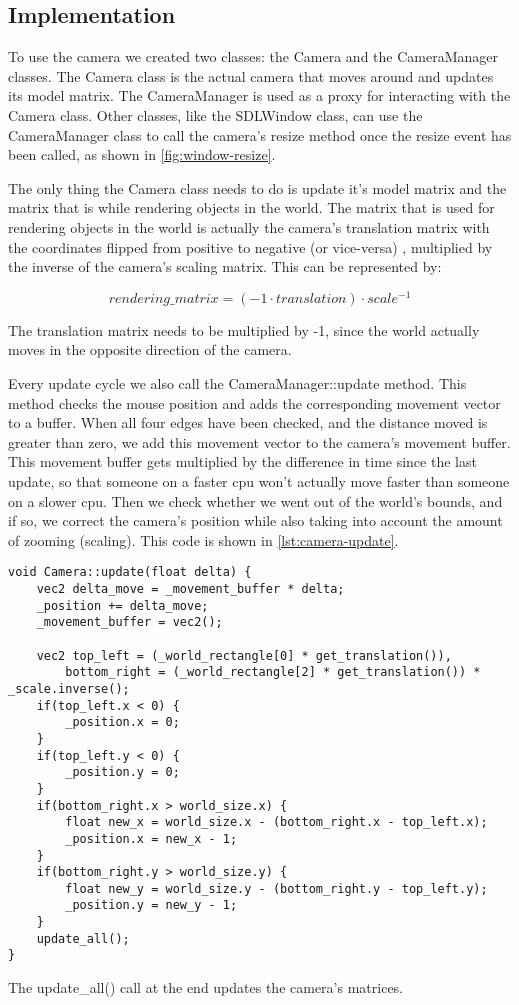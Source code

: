 \subsection{Implementation}
To use the camera we created two classes: the Camera and the CameraManager 
classes. The Camera class is the actual camera that moves around and updates 
its model matrix. The CameraManager is used as a proxy for interacting with 
the Camera class. Other classes, like the SDLWindow class, can use the 
CameraManager class to call the camera's resize method once the resize event 
has been called, as shown in \cref{fig:window-resize}.

The only thing the Camera class needs to do is update it's model matrix and 
the matrix that is while rendering objects in the world. The matrix that is 
used for rendering objects in the world is actually the camera's translation 
matrix with the coordinates flipped from positive to negative (or vice-versa)
, multiplied by the inverse of the camera's scaling matrix.
This can be represented by:

$$ rendering\_matrix = (-1 \cdot translation) \cdot scale^{-1} $$

The translation matrix needs to be multiplied by -1, since the world actually 
moves in the opposite direction of the camera.

Every update cycle we also call the CameraManager::update method. This method 
checks the mouse position and adds the corresponding movement vector to a 
buffer. When all four edges have been checked, and the distance moved is 
greater than zero, we add this movement vector to the camera's movement 
buffer. This movement buffer gets multiplied by the difference in time since 
the last update, so that someone on a faster cpu won't actually move faster 
than someone on a slower cpu. Then we check whether we went out of the world's 
bounds, and if so, we correct the camera's position while also taking into 
account the amount of zooming (scaling). This code is shown in 
\cref{lst:camera-update}.

\begin{lstlisting}[caption={Camera update method.},label={lst:camera-update}]
void Camera::update(float delta) {
    vec2 delta_move = _movement_buffer * delta;
    _position += delta_move;
    _movement_buffer = vec2();

    vec2 top_left = (_world_rectangle[0] * get_translation()),
        bottom_right = (_world_rectangle[2] * get_translation()) * _scale.inverse();
    if(top_left.x < 0) {
        _position.x = 0;
    }
    if(top_left.y < 0) {
        _position.y = 0;
    }
    if(bottom_right.x > world_size.x) {
        float new_x = world_size.x - (bottom_right.x - top_left.x);
        _position.x = new_x - 1;
    }
    if(bottom_right.y > world_size.y) {
        float new_y = world_size.y - (bottom_right.y - top_left.y);
        _position.y = new_y - 1;
    }
    update_all();
}
\end{lstlisting}

The update\_all() call at the end updates the camera's matrices.

